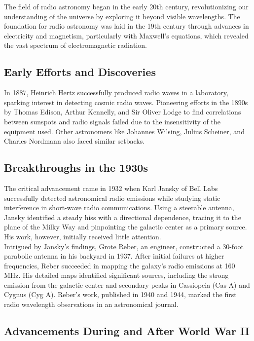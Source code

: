 The field of radio astronomy began in the early 20th century, revolutionizing our understanding of the universe by exploring it beyond visible wavelengths. The foundation for radio astronomy was laid in the 19th century through advances in electricity and magnetism, particularly with Maxwell's equations, which revealed the vast spectrum of electromagnetic radiation.

\subsection{Early Efforts and Discoveries}

In 1887, Heinrich Hertz successfully produced radio waves in a laboratory, sparking interest in detecting cosmic radio waves. Pioneering efforts in the 1890s by Thomas Edison, Arthur Kennelly, and Sir Oliver Lodge to find correlations between sunspots and radio signals failed due to the insensitivity of the equipment used. Other astronomers like Johannes Wilsing, Julius Scheiner, and Charles Nordmann also faced similar setbacks.

\subsection{Breakthroughs in the 1930s}

The critical advancement came in 1932 when Karl Jansky of Bell Labs successfully detected astronomical radio emissions while studying static interference in short-wave radio communications. Using a steerable antenna, Jansky identified a steady hiss with a directional dependence, tracing it to the plane of the Milky Way and pinpointing the galactic center as a primary source. His work, however, initially received little attention. \\

Intrigued by Jansky's findings, Grote Reber, an engineer, constructed a 30-foot parabolic antenna in his backyard in 1937. After initial failures at higher frequencies, Reber succeeded in mapping the galaxy's radio emissions at 160 MHz. His detailed maps identified significant sources, including the strong emission from the galactic center and secondary peaks in Cassiopeia (Cas A) and Cygnus (Cyg A). Reber's work, published in 1940 and 1944, marked the first radio wavelength observations in an astronomical journal.

\subsection{Advancements During and After World War II}

